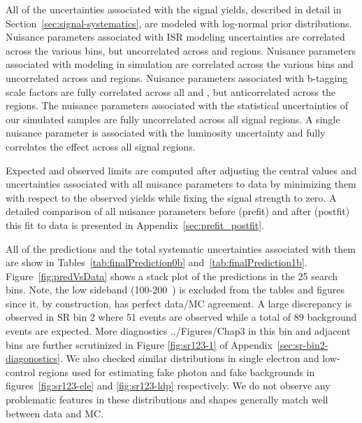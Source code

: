 All of the uncertainties associated with the signal yields, described in detail
in Section~\ref{sec:signal-systematics}, are modeled with log-normal prior distributions.  
Nuisance parameters associated with ISR modeling uncertainties are correlated 
across the various \nj bins, but uncorrelated across \nb and \ptmiss regions.  
Nuisance parameters associated with \ptmiss modeling in simulation are
correlated across the various \ptmiss bins and uncorrelated across \nb and 
\nj regions.  Nuisance parameters associated with b-tagging scale factors are fully correlated
across all \ptmiss and \nj, but anticorrelated across the \nb regions. The nuisance 
parameters associated with the statistical uncertainties of our simulated samples
are fully uncorrelated across all signal regions. A single nuisance parameter
is associated with the luminosity uncertainty and fully correlates the effect
across all signal regions. 

Expected and observed limits are computed after adjusting the central values
and uncertainties associated with all nuisance parameters to data by minimizing 
them with respect to the observed yields while fixing the signal strength to
zero. A detailed comparison of all nuisance parameters before (prefit) and after
(postfit) this fit to data is presented in Appendix~\ref{sec:prefit_postfit}.

All of the predictions and the total systematic uncertainties associated with 
them are show in Tables~\ref{tab:finalPrediction0b} and~\ref{tab:finalPrediction1b}.
Figure~\ref{fig:predVsData} shows a stack plot of the predictions in the 25 search bins. Note, 
the low \ptmiss sideband (100-200~\gev) is excluded from the tables and figures since it, by construction,
has perfect data/MC agreement. A large discrepancy is observed in SR bin 2 where 51 events are observed while 
a total of 89 background events are expected. More diagnostics ../Figures/Chap3 in this bin and 
adjacent bins are further scrutinized in Figure \ref{fig:sr123-1} of Appendix~\ref{sec:sr-bin2-diagonostics}.
We also checked similar distributions in single electron and low-\dphi control regions
used for estimating fake photon and fake \ptmiss backgrounds in figures~\ref{fig:sr123-ele} and \ref{fig:sr123-ldp} respectively. 
We do not observe any problematic features in these distributions and shapes generally match well between data and MC.

